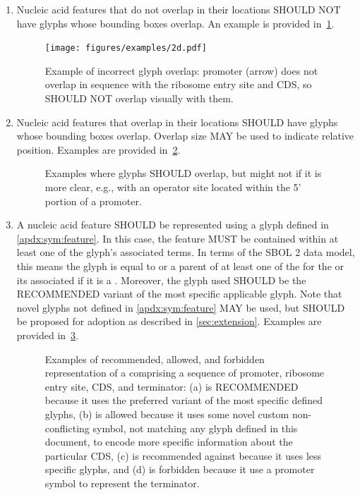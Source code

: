 \begin{enumerate}
\item Nucleic acid features that do not overlap in their locations SHOULD NOT have glyphs whose bounding boxes overlap.
	An example is provided in~\ref{exa:2d}.
	\begin{figure}[h!]
	\centering
	\texttt{[image: figures/examples/2d.pdf]}
	\caption{Example of incorrect glyph overlap: promoter (arrow) does not overlap in sequence with the ribosome entry site and CDS, so SHOULD NOT overlap visually with them.}
	\label{exa:2d}
	\end{figure}

\item Nucleic acid features that overlap in their locations SHOULD have glyphs whose bounding boxes overlap.  Overlap size MAY be used to indicate relative position.
	Examples are provided in~\ref{exa:2e}.

	\begin{figure}[h!]
	\centering
	\caption{Examples where glyphs SHOULD overlap, but might not if it is more clear, e.g., with an operator site located within the 5' portion of a promoter.}
	\label{exa:2e}
	\end{figure}

\item A nucleic acid feature SHOULD be represented using a glyph defined in \ref{apdx:sym:feature}.  In this case, the feature MUST be contained within at least one of the glyph's associated terms.
In terms of the SBOL 2 data model, this means the glyph is equal to or a parent of at least one of the  for the  or its associated  if it is a .
	Moreover, the glyph used SHOULD be the RECOMMENDED variant of the most specific applicable glyph.  Note that novel glyphs not defined in \ref{apdx:sym:feature} MAY be used, but SHOULD be proposed for adoption as described in \ref{sec:extension}.
	Examples are provided in~\ref{exa:2f}.
	\begin{figure}[h!]
	\centering
	\caption{Examples of recommended, allowed, and forbidden representation of a  comprising a sequence of promoter, ribosome entry site, CDS, and terminator: (a) is RECOMMENDED because it uses the preferred variant of the most specific defined glyphs, (b) is allowed because it uses some novel custom non-conflicting symbol, not matching any glyph defined in this document, to encode more specific information about the particular CDS, (c) is recommended against because it uses less specific glyphs, and (d) is forbidden because it use a promoter symbol to represent the terminator.}
	\label{exa:2f}
	\end{figure}
\end{enumerate}


